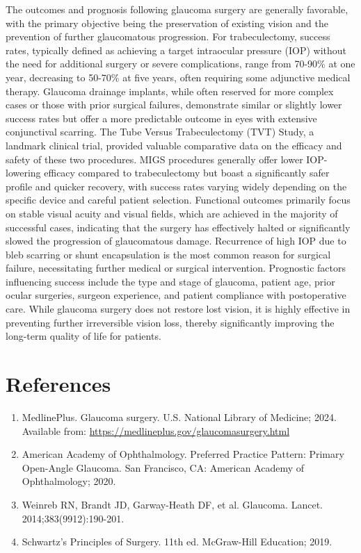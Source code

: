 The outcomes and prognosis following glaucoma surgery are generally favorable, with the primary objective being the preservation of existing vision and the prevention of further glaucomatous progression. For trabeculectomy, success rates, typically defined as achieving a target intraocular pressure (IOP) without the need for additional surgery or severe complications, range from 70-90\% at one year, decreasing to 50-70\% at five years, often requiring some adjunctive medical therapy. Glaucoma drainage implants, while often reserved for more complex cases or those with prior surgical failures, demonstrate similar or slightly lower success rates but offer a more predictable outcome in eyes with extensive conjunctival scarring. The Tube Versus Trabeculectomy (TVT) Study, a landmark clinical trial, provided valuable comparative data on the efficacy and safety of these two procedures. MIGS procedures generally offer lower IOP-lowering efficacy compared to trabeculectomy but boast a significantly safer profile and quicker recovery, with success rates varying widely depending on the specific device and careful patient selection. Functional outcomes primarily focus on stable visual acuity and visual fields, which are achieved in the majority of successful cases, indicating that the surgery has effectively halted or significantly slowed the progression of glaucomatous damage. Recurrence of high IOP due to bleb scarring or shunt encapsulation is the most common reason for surgical failure, necessitating further medical or surgical intervention. Prognostic factors influencing success include the type and stage of glaucoma, patient age, prior ocular surgeries, surgeon experience, and patient compliance with postoperative care. While glaucoma surgery does not restore lost vision, it is highly effective in preventing further irreversible vision loss, thereby significantly improving the long-term quality of life for patients.

\section*{References}
\begin{enumerate}
  \item MedlinePlus. Glaucoma surgery. U.S. National Library of Medicine; 2024. Available from: \url{https://medlineplus.gov/glaucomasurgery.html}
  \item American Academy of Ophthalmology. Preferred Practice Pattern: Primary Open-Angle Glaucoma. San Francisco, CA: American Academy of Ophthalmology; 2020.
  \item Weinreb RN, Brandt JD, Garway-Heath DF, et al. Glaucoma. Lancet. 2014;383(9912):190-201.
  \item Schwartz's Principles of Surgery. 11th ed. McGraw-Hill Education; 2019.
\end{enumerate}

\clearpage

